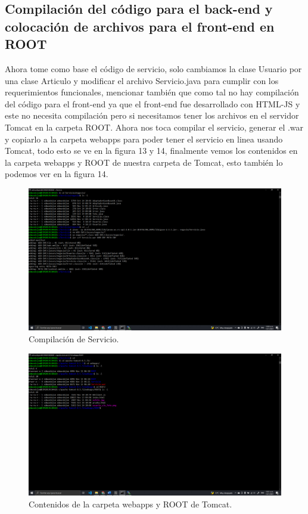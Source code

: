 \documentclass[11pt]{article}
\begin{document}
		\subsection{Compilación del código para el back-end y colocación de archivos para el front-end en ROOT}
		Ahora tome como base el código de servicio, solo cambiamos la clase Usuario por una clase Articulo y modificar el archivo Servicio.java para cumplir con los requerimientos funcionales, mencionar también que como tal no hay compilación del código para el front-end ya que el front-end fue desarrollado con HTML-JS y este no necesita compilación pero si necesitamos tener los archivos en el servidor Tomcat en la carpeta ROOT. Ahora nos toca compilar el servicio, generar el .war y copiarlo a la carpeta webapps para poder tener el servicio en linea usando Tomcat, todo esto se ve en la figura 13 y 14, finalmente vemos los contenidos en la carpeta webapps y ROOT de nuestra carpeta de Tomcat, esto también lo podemos ver en la figura 14.
		\begin{figure}[H]
			\centering
			\includegraphics[scale=0.34]{resources/compilacionback.png}
			\caption{Compilación de Servicio.}\label{fig:picture}
		\end{figure}
		\begin{figure}[H]
			\centering
			\includegraphics[scale=0.34]{resources/warinwebappsandfront.png}
			\caption{Contenidos de la carpeta webapps y ROOT de Tomcat.}\label{fig:picture}
		\end{figure}
\end{document}
